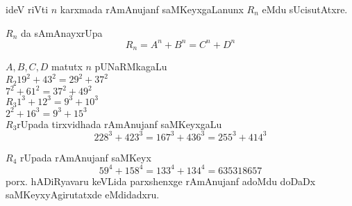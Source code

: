 ideV riVti $n$  karxmada rAmAnujanf saMKeyxgaLanunx $R_n$ eMdu sUcisutAtxre.

$R_n$ da sAmAnayxrUpa
$$
R_n=A^n+B^n = C^n+D^n
$$

$A,B,C,D$ matutx $n$ pUNaRMkagaLu\\[0.02cm]

$R_2 $\;\qquad $19^2+43^2 = 29^2 + 37^2$\\
{}\qquad\qquad $7^2+61^2 = 37^2+49^2$\\[0.02cm]

$R_3$\;\quad $1^3+12^3 = 9^3+10^3$\\
\quad\qquad $2^2+16^3 = 9^3+15^3$\\[0.02cm]

$R_3$\;rUpada tirxvidhada rAmAnujanf saMKeyxgaLu
$$
 228^3+423^3 = 167^3+436^3 = 255^3+414^3
$$

$R_4$ rUpada rAmAnujanf saMKeyx
$$
59^4+158^4 =133^4+134^4 = 635318657
$$
porx. hADiRyavaru keVLida parxshenxge rAmAnujanf adoMdu doDaDx saMKeyxyAgirutatxde eMdidadxru.

